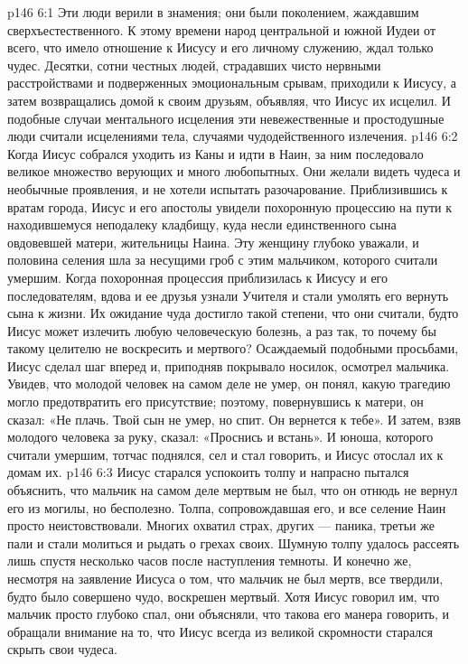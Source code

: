 \vs p146 6:1 Эти люди верили в знамения; они были поколением, жаждавшим сверхъестественного. К этому времени народ центральной и южной Иудеи от всего, что имело отношение к Иисусу и его личному служению, ждал только чудес. Десятки, сотни честных людей, страдавших чисто нервными расстройствами и подверженных эмоциональным срывам, приходили к Иисусу, а затем возвращались домой к своим друзьям, объявляя, что Иисус их исцелил. И подобные случаи ментального исцеления эти невежественные и простодушные люди считали исцелениями тела, случаями чудодейственного излечения.
\vs p146 6:2 \pc Когда Иисус собрался уходить из Каны и идти в Наин, за ним последовало великое множество верующих и много любопытных. Они желали видеть чудеса и необычные проявления, и не хотели испытать разочарование. Приблизившись к вратам города, Иисус и его апостолы увидели похоронную процессию на пути к находившемуся неподалеку кладбищу, куда несли единственного сына овдовевшей матери, жительницы Наина. Эту женщину глубоко уважали, и половина селения шла за несущими гроб с этим мальчиком, которого считали умершим. Когда похоронная процессия приблизилась к Иисусу и его последователям, вдова и ее друзья узнали Учителя и стали умолять его вернуть сына к жизни. Их ожидание чуда достигло такой степени, что они считали, будто Иисус может излечить любую человеческую болезнь, а раз так, то почему бы такому целителю не воскресить и мертвого? Осаждаемый подобными просьбами, Иисус сделал шаг вперед и, приподняв покрывало носилок, осмотрел мальчика. Увидев, что молодой человек на самом деле не умер, он понял, какую трагедию могло предотвратить его присутствие; поэтому, повернувшись к матери, он сказал: «Не плачь. Твой сын не умер, но спит. Он вернется к тебе». И затем, взяв молодого человека за руку, сказал: «Проснись и встань». И юноша, которого считали умершим, тотчас поднялся, сел и стал говорить, и Иисус отослал их к домам их.
\vs p146 6:3 Иисус старался успокоить толпу и напрасно пытался объяснить, что мальчик на самом деле мертвым не был, что он отнюдь не вернул его из могилы, но бесполезно. Толпа, сопровождавшая его, и все селение Наин просто неистовствовали. Многих охватил страх, других --- паника, третьи же пали и стали молиться и рыдать о грехах своих. Шумную толпу удалось рассеять лишь спустя несколько часов после наступления темноты. И конечно же, несмотря на заявление Иисуса о том, что мальчик не был мертв, все твердили, будто было совершено чудо, воскрешен мертвый. Хотя Иисус говорил им, что мальчик просто глубоко спал, они объясняли, что такова его манера говорить, и обращали внимание на то, что Иисус всегда из великой скромности старался скрыть свои чудеса.
